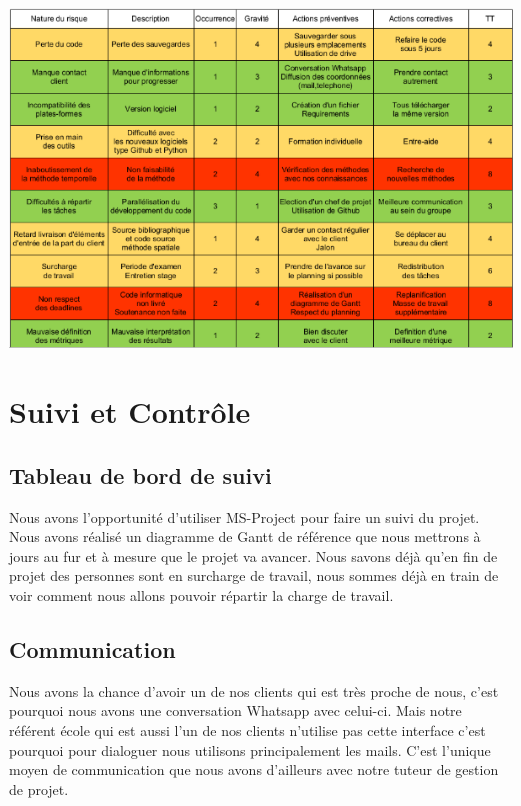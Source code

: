 \documentclass[a4paper,12pt]{report}
\theoremstyle{break}
\begin{document}
    \begin{center}

    \includegraphics[width=1\textwidth]{images/matrice.png}\\[1cm]

    \end{center} 
    
    
\chapter{Suivi et Contrôle}
\section{Tableau de bord de suivi}
    Nous avons l’opportunité d’utiliser MS-Project pour faire un suivi du projet. Nous avons réalisé un diagramme de Gantt de référence que nous mettrons à jours au fur et à mesure que le projet va avancer. Nous savons déjà qu’en fin de projet des personnes sont en surcharge de travail, nous sommes déjà en train de voir comment nous allons pouvoir répartir la charge de travail. 

\section{Communication }

    Nous avons la chance d’avoir un de nos clients qui est très proche de nous, c’est pourquoi nous avons une conversation Whatsapp avec celui-ci. Mais notre référent école qui est aussi l’un de nos clients n’utilise pas cette interface c’est pourquoi pour dialoguer nous utilisons principalement les mails. C’est l’unique moyen de communication que nous avons d’ailleurs avec notre tuteur de gestion de projet. 
    
\end{document}
